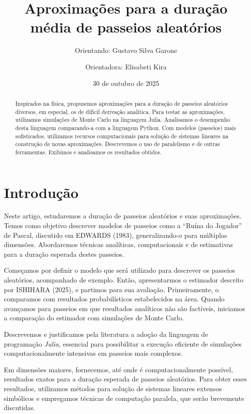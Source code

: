 \documentclass[
  brazilian,
  12pt,
]{article}
\title{Aproximações para a duração média de passeios aleatórios}
\author{Orientando: Gustavo Silva Garone \and Orientadora: Elisabeti
Kira}
\date{30 de outubro de 2025}
\theoremstyle{definition}
\theoremstyle{remark}
\begin{document}
\maketitle
\begin{abstract}
Inspirados na física, propusemos aproximações para a duração de passeios
aleatórios diversos, em especial, os de difícil derivação analítica.
Para testar as aproximações, utilizamos simulações de Monte Carlo na
linguagem Julia. Analisamos o desempenho desta linguagem comparando-a
com a linguagem Python. Com modelos (passeios) mais sofisticados,
utilizamos recursos computacionais para solução de sistemas lineares na
construção de novas aproximações. Descrevemos o uso de paralelismo e de
outras ferramentas. Exibimos e analisamos os resultados obtidos.
\end{abstract}


\section{Introdução}\label{introduuxe7uxe3o}

Neste artigo, estudaremos a duração de passeios aleatórios e suas
aproximações. Temos como objetivo descrever modelos de passeios como a
``Ruína do Jogador'' de Pascal, discutido em EDWARDS (1983),
generalizando-o para múltiplas dimensões. Abordaremos técnicas
analíticas, computacionais e de estimativas para a duração esperada
destes passeios.

Começamos por definir o modelo que será utilizado para descrever os
passeios aleatórios, acompanhado de exemplo. Então, apresentarmos o
estimador descrito por ISHIHARA (2025), e partimos para sua avaliação.
Primeiramente, o comparamos com resultados probabilísticos estabelecidos
na área. Quando avançamos para passeios em que resultados analíticos não
são factíveis, iniciamos a comparação do estimador com simulações de
Monte Carlo.

Descrevemos e justificamos pela literatura a adoção da linguagem de
programação \emph{Julia}, essencial para possibilitar a execução
eficiente de simulações computacionalmente intensivas em passeios mais
complexos.

Em dimensões maiores, fornecemos, até onde é computacionalmente
possível, resultados exatos para a duração esperada de passeios
aleatórios. Para obter esses resultados, utilizamos métodos para solução
de sistemas lineares extensos simbólicos e empregamos técnicas de
computação paralela, que serão brevemente discutidas.
\end{document}
